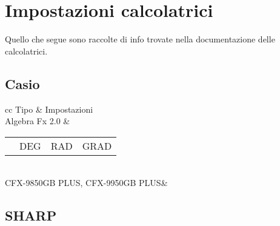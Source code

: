 \chapter{Impostazioni calcolatrici}
Quello che segue sono raccolte di info  trovate nella documentazione delle calcolatrici.
\section{Casio}
\begin{tabular}{cc}
\toprule
Tipo	& Impostazioni \\ 
\midrule 
Algebra Fx 2.0	&  \begin{tabular}{llll}
	\tastosetup\tastoangle&DEG&RAD&GRAD\\ 
\end{tabular}\\
CFX-9850GB PLUS, CFX-9950GB PLUS&\\ 
\bottomrule
\end{tabular}
\section{SHARP}

